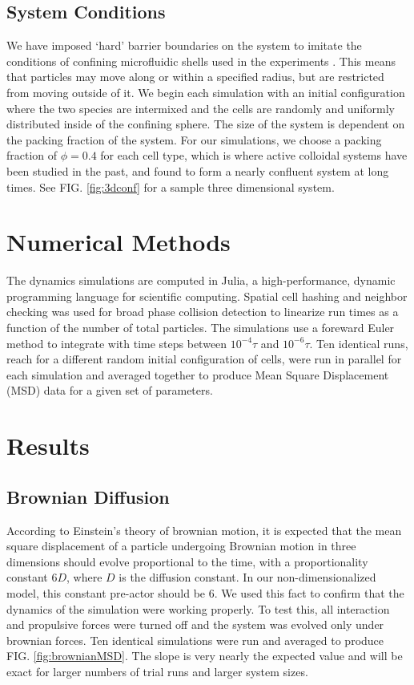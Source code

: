 \documentclass[aps,prb,twocolumn,groupedaddress,nofootinbib,floatfix]{revtex4}
\begin{document}

\subsection*{System Conditions}
We have imposed `hard' barrier boundaries on the system to imitate the conditions of confining microfluidic shells used in the experiments \cite{Mingming}. 
This means that particles may move along or within a specified radius, but are restricted from moving outside of it. We begin each simulation with an initial configuration 
where the two species are intermixed and the cells are randomly and uniformly distributed inside of the confining sphere. The size of the system is dependent on the 
packing fraction of the system. For our simulations, we choose a packing fraction of $\phi=0.4$ for each cell type, which is where active colloidal systems have been 
studied in the past\cite{RednerBaskaran}, and found to form a nearly confluent system at long times. See FIG. \ref{fig:3dconf} for a sample three dimensional system.


\section{Numerical Methods}

The dynamics simulations are computed in Julia, a high-performance, dynamic 
programming language for scientific computing. Spatial cell hashing and neighbor 
checking was used for broad phase collision detection to linearize run times 
as a function of the number of total particles. The simulations use a foreward 
Euler method to integrate with time steps between $10^{-4}\tau$ and $10^{-6}\tau$.
Ten identical runs, reach for a different random initial configuration of cells, were run in parallel for each simulation
and averaged together to produce Mean Square Displacement (MSD) data for a given set of parameters.

\section{Results}

\subsection{Brownian Diffusion}
According to Einstein's theory of brownian motion, it is expected that the mean
square displacement of a particle undergoing Brownian motion in three dimensions should evolve proportional to the time, with a proportionality constant $6 D$, where $D$ is the diffusion constant. In our non-dimensionalized model, this constant pre-actor should be $6$. We used this fact to confirm that the dynamics of the simulation were working properly. To test this, all interaction and propulsive forces were turned off and the system was evolved only under brownian forces. Ten identical simulations were run and averaged to produce FIG. \ref{fig:brownianMSD}. The slope is very nearly the expected value and will be exact for larger numbers of trial runs and larger system sizes.
\end{document}
